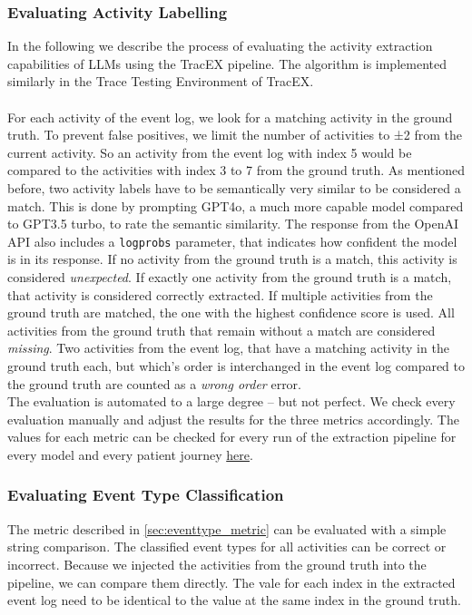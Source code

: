 \subsubsection{Evaluating Activity Labelling}\label{sec:eval_activity}
In the following we describe the process of evaluating the activity extraction capabilities of LLMs using the TracEX pipeline. The algorithm is implemented similarly in the Trace Testing Environment of TracEX.\\\\
For each activity of the event log, we look for a matching activity in the ground truth. To prevent false positives, we limit the number of activities to ±2 from the current activity. So an activity from the event log with index 5 would be compared to the activities with index 3 to 7 from the ground truth. As mentioned before, two activity labels have to be semantically very similar to be considered a match. This is done by prompting GPT4o, a much more capable model compared to GPT3.5 turbo, to rate the semantic similarity. The response from the OpenAI API also includes a \verb|logprobs| parameter, that indicates how confident the model is in its response. If no activity from the ground truth is a match, this activity is considered \emph{unexpected}. If exactly one activity from the ground truth is a match, that activity is considered correctly extracted. If multiple activities from the ground truth are matched, the one with the highest confidence score is used. All activities from the ground truth that remain without a match are considered \emph{missing}. Two activities from the event log, that have a matching activity in the ground truth each, but which's order is interchanged in the event log compared to the ground truth are counted as a \emph{wrong order} error.\\
The evaluation is automated to a large degree – but not perfect. We check every evaluation manually and adjust the results for the three metrics accordingly. The values for each metric can be checked for every run of the extraction pipeline for every model and every patient journey \href{https://github.com/FR-SON/Bachelor-Thesis/tree/main/bachelor_thesis/data/evaluation_data}{here}.

\subsubsection{Evaluating Event Type Classification}\label{sec:eval_event_type}
The metric described in \autoref{sec:eventtype_metric} can be evaluated with a simple string comparison. The classified event types for all activities can be correct or incorrect. Because we injected the activities from the ground truth into the pipeline, we can compare them directly. The vale for each index in the extracted event log need to be identical to the value at the same index in the ground truth.

